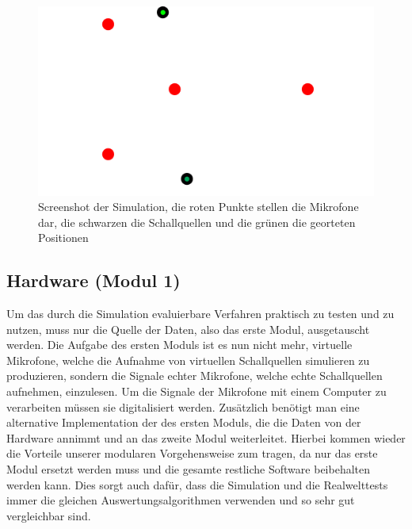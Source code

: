 \begin{figure}[H]
  \includegraphics[width=\linewidth]{img/bildsimulation}
  \caption{Screenshot der Simulation, die roten Punkte stellen die Mikrofone dar, die schwarzen die Schallquellen und die grünen die georteten Positionen}
\end{figure}

\subsection{Hardware (Modul 1)}
Um das durch die Simulation evaluierbare Verfahren praktisch zu testen und zu nutzen, muss nur die Quelle der Daten, also das erste Modul, ausgetauscht werden. Die Aufgabe des ersten Moduls ist es nun nicht mehr, virtuelle Mikrofone, welche die Aufnahme von virtuellen Schallquellen simulieren zu produzieren, sondern die Signale echter Mikrofone, welche echte Schallquellen aufnehmen, einzulesen. Um die Signale der Mikrofone mit einem Computer zu verarbeiten müssen sie digitalisiert werden. Zusätzlich benötigt man eine alternative Implementation der des ersten Moduls, die die Daten von der Hardware annimmt und an das zweite Modul weiterleitet. Hierbei kommen wieder die Vorteile unserer modularen Vorgehensweise zum tragen, da nur das erste Modul ersetzt werden muss und die gesamte restliche Software beibehalten werden kann. Dies sorgt auch dafür, dass die Simulation und die Realwelttests immer die gleichen Auswertungsalgorithmen verwenden und so sehr gut vergleichbar sind.

